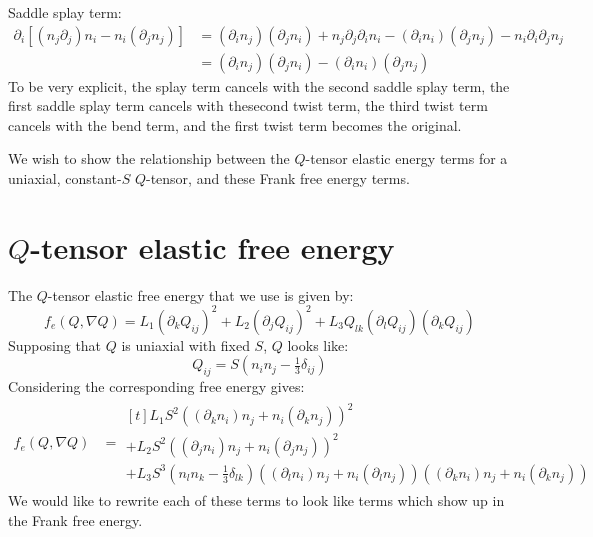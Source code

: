 \documentclass[reqno]{article}
\begin{document}
Saddle splay term:
\begin{equation}
\begin{split}
    \partial_i [(n_j \partial_j) n_i - n_i (\partial_j n_j)]
    &=
    (\partial_i n_j) (\partial_j n_i) + n_j \partial_j \partial_i n_i
    - (\partial_i n_i) (\partial_j n_j) - n_i \partial_i \partial_j n_j \\
    &= (\partial_i n_j) (\partial_j n_i) - (\partial_i n_i) (\partial_j n_j)
\end{split}
\end{equation}
To be very explicit, the splay term cancels with the second saddle splay term, the first saddle splay term cancels with thesecond twist term, the third twist term cancels with the bend term, and the first twist term becomes the original.

We wish to show the relationship between the $Q$-tensor elastic energy terms for a uniaxial, constant-$S$ $Q$-tensor, and these Frank free energy terms.

\section{$Q$-tensor elastic free energy}
The $Q$-tensor elastic free energy that we use is given by:
\begin{equation}
    f_e (Q, \nabla Q)
    =
    L_1 \left( \partial_k Q_{ij} \right)^2
    + L_2 \left( \partial_j Q_{ij} \right)^2
    + L_3 Q_{lk} \left( \partial_{l} Q_{ij} \right) \left( \partial_k Q_{ij} \right)
\end{equation}
Supposing that $Q$ is uniaxial with fixed $S$, $Q$ looks like:
\begin{equation}
    Q_{ij}
    =
    S \left( n_i n_j - \tfrac13 \delta_{ij} \right)
\end{equation}
Considering the corresponding free energy gives:
\begin{equation}
\begin{split}
    f_e (Q, \nabla Q)
    &=
    \begin{multlined}[t]
        L_1 S^2 \left( (\partial_k n_i) n_j + n_i (\partial_k n_j) \right)^2 \\
        + L_2 S^2 \left( (\partial_j n_i) n_j + n_i (\partial_j n_j) \right)^2 \\
        + L_3 S^3 \left(n_l n_k - \tfrac13 \delta_{lk}\right) 
          \left( (\partial_l n_i) n_j + n_i (\partial_l n_j) \right) 
          \left( (\partial_k n_i) n_j + n_i (\partial_k n_j) \right)
    \end{multlined}
\end{split}
\end{equation}
We would like to rewrite each of these terms to look like terms which show up in the Frank free energy.
\end{document}
